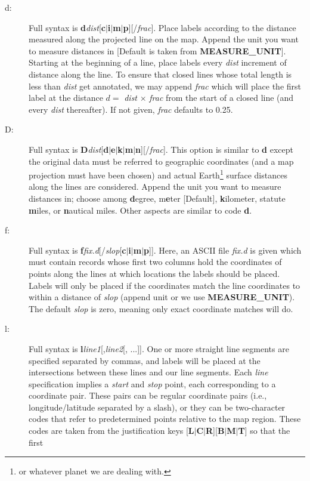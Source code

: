 \begin{description}
\item [d:] Full syntax is {\bf d}{\it dist}[{\bf c$|$i$|$m$|$p}][/{\it frac}].
Place labels according to the distance measured along the projected line on the map.  Append the
unit you want to measure distances in [Default is taken from {\bf MEASURE\_UNIT}].
Starting at the beginning of a line, place labels every {\it dist} increment of
distance along the line.  To ensure that closed lines whose total length is less
than {\it dist} get annotated, we may append {\it frac} which will place the first
label at the distance $d =$ {\it dist} $\times$ {\it frac} from the start of a closed
line (and every {\it dist} thereafter).  If not given, {\it frac} defaults to 0.25.
\item [D:] Full syntax is {\bf D}{\it dist}[{\bf d$|$e$|$k$|$m$|$n}][/{\it frac}].
This option is similar to {\bf d} except the original data must be referred to geographic
coordinates (and a map projection must have been chosen) and actual Earth\footnote{or whatever
planet we are dealing with.} surface distances along the lines are considered.  Append the
unit you want to measure distances in; choose among {\bf d}egree, m{\bf e}ter [Default],
{\bf k}ilometer, statute {\bf m}iles, or {\bf n}autical miles.  Other aspects are similar to code {\bf d}.
\item [f:] Full syntax is {\bf f}{\it fix.d}[/{\it slop}[{\bf c$|$i$|$m$|$p}]].  Here, an ASCII file {\it fix.d} is
given which must contain records whose first two columns hold the coordinates of points along
the lines at which locations the labels should be placed.  Labels will only be placed if the coordinates
match the line coordinates to within a distance of {\it slop} (append unit or we use {\bf MEASURE\_UNIT}).
The default {\it slop} is zero, meaning only exact coordinate matches will do.
\item [l:] Full syntax is {\bf l}{\it line1}[,{\it line2}[, ...]].  One or more straight line segments
are specified separated by commas, and labels will be placed at the intersections between these lines and
our line segments.  Each {\it line} specification implies a {\it start} and {\it stop} point, each
corresponding to a coordinate pair.  These pairs can be regular coordinate pairs (i.e., longitude/latitude separated by a slash), or they
can be two-character codes that refer to predetermined points relative to the map region.  These codes
are taken from the  justification keys [{\bf L$|$C$|$R}][{\bf B$|$M$|$T}] so that the first

\end{description}
